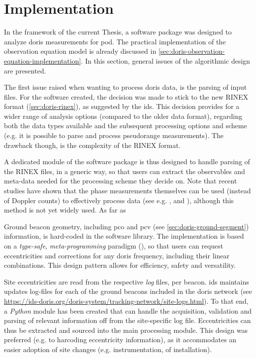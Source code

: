 \section{Implementation}\label{sec:doris-implementation}
In the framework of the current Thesis, a software package was designed to analyze 
\gls{doris} measurements for \gls{pod}. The practical implementation of the observation 
equation model is already discussed in \autoref{sec:doris-observation-equation-implementation}. 
In this section, general issues of the algorithmic design are presented.

The first issue raised when wanting to process \gls{doris} data, is the parsing of 
input files. For the software created, the decision was made to stick to the new 
RINEX format (\autoref{sec:doris-rinex}), as suggested by the \gls{ids}. This decision 
provides for a wider range of analysis options (compared to the older data format), 
regarding both the data types available and the subsequent processing options and 
scheme (e.g. it is possible to parse and process pseudorange measurements). The 
drawback though, is the complexity of the RINEX format.

A dedicated module of the software package is thus designed to handle parsing of the 
RINEX files, in a generic way, so that users can extract the observables and meta-data 
needed for the processing scheme they decide on. Note that recent studies have shown that 
the phase measurements themselves can be used (instead of Doppler counts) to effectively 
process data (see e.g. \cite{Mercier2010}, \cite{Dettmering2014} and \cite{Zhou2020}), 
although this method is not yet widely used. As far as 

Ground beacon geometry, including \gls{pco} and \gls{pcv} (see \autoref{sec:doris-ground-segment}) 
information, is hard-coded in the software library. The implementation is based on a 
\emph{type-safe}, \emph{meta-programming} paradigm (\cite{Vandevoorde2017}), so that 
users can request eccentricities and corrections for any \gls{doris} frequency, including 
their linear combinations. This design pattern allows for efficiency, safety and 
versatility.

Site eccentricities are read from the respective \emph{log} files, per beacon. 
\gls{ids} maintains updates log-files for each of the ground beacons included in 
the \gls{doris} network (see \url{https://ids-doris.org/doris-system/tracking-network/site-logs.html}). 
To that end, a \emph{Python} module has been created that can handle the acquisition, 
validation and parsing of relevant information off from the site-specific log file. 
Eccentricities can thus be extracted and sourced into the main processing module. 
This design was preferred (e.g. to harcoding eccentricity information), as it accommodates 
an easier adoption of site changes (e.g. instrumentation, of installation).

